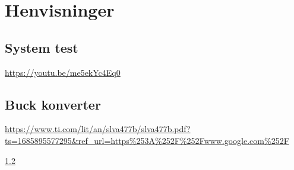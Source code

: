 \section{Henvisninger} \label{Chap:Henvisninger}
\subsection{System test}\label{subsection:System test}
\url{https://youtu.be/me5ekYc4Eq0}

\subsection{Buck konverter}\label{subsection:Buck konverter}
\url{https://www.ti.com/lit/an/slva477b/slva477b.pdf?ts=1685895577295&ref_url=https%253A%252F%252Fwww.google.com%252F}

\ref{subsection:Buck konverter}